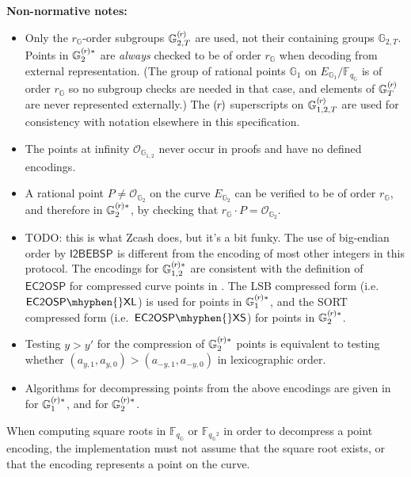 \documentclass{article}
\newcommand{\callout}[1]{\vspace{2ex plus 2pt minus 2pt}\noindent\textbf{#1}\hspace{1em}}
\newenvironment{nnotes}{\callout{Non-normative notes:}\begin{itemize}}{\end{itemize}}
\newcommand{\Field}[1]{\mathbb{F}_{\!#1}}
\newcommand{\mult}{\cdot}
\newcommand{\Curve}{E}
\newcommand{\Zero}{\mathcal{O}}
\newcommand{\subgroupr}{(\kern-0.075emr\kern-0.075em)}
\newcommand{\ParamG}[1]{{{#1}_\mathbb{G}}}
\newcommand{\ParamGexp}[2]{{{#1}_\mathbb{G}\!}^{#2}}
\newcommand{\GroupG}[1]{\mathbb{G}_{#1}}
\newcommand{\SubgroupG}[1]{\GroupG{#1}^{\subgroupr}}
\newcommand{\SubgroupGstar}[1]{\GroupG{#1}^{\subgroupr\ast}}
\newcommand{\CurveG}[1]{\Curve_{\GroupG{#1}}}
\newcommand{\ZeroG}[1]{\Zero_{\GroupG{#1}}}
\newcommand{\ECtoOSP}{\mathsf{EC2OSP}}
\newcommand{\ECtoOSPXL}{\mathsf{EC2OSP\mhyphen{}XL}}
\newcommand{\ECtoOSPXS}{\mathsf{EC2OSP\mhyphen{}XS}}
\newcommand{\ItoBEBSP}[1]{\mathsf{I2BEBSP}_{#1}}
\begin{document}
\begin{nnotes}
  \item Only the $\ParamG{r}$-order subgroups $\SubgroupG{2, T}$ are used,
        not their containing groups $\GroupG{2, T}$. Points in
        $\SubgroupGstar{2}$ are \emph{always} checked to be of order $\ParamG{r}$ when
        decoding from external representation. (The group of rational points $\GroupG{1}$
        on $\CurveG{1}/\Field{\ParamG{q}}$ is of order $\ParamG{r}$ so no subgroup checks are
        needed in that case, and elements of $\SubgroupG{T}$ are never represented externally.)
        The $\subgroupr$ superscripts on $\SubgroupG{1, 2, T}$ are used for consistency with
        notation elsewhere in this specification.
  \item The points at infinity $\ZeroG{1, 2}$ never occur in proofs and have no defined encodings.
  \item A rational point $P \neq \ZeroG{2}$ on the curve $\CurveG{2}$ can be
        verified to be of order $\ParamG{r}$, and therefore in $\SubgroupGstar{2}$,
        by checking that $\ParamG{r} \mult P = \ZeroG{2}$.
  \item TODO: this is what Zcash does, but it's a bit funky.
        The use of big-endian order by $\ItoBEBSP{}$ is different from the encoding
        of most other integers in this protocol.
        The encodings for $\SubgroupGstar{1, 2}$ are consistent with the
        definition of $\ECtoOSP{}$ for compressed curve points in
        \cite[section 5.5.6.2]{IEEE2004}. The LSB compressed form
        (i.e.\ $\ECtoOSPXL$) is used for points in $\SubgroupGstar{1}$,
        and the SORT compressed form (i.e.\ $\ECtoOSPXS$) for points in
        $\SubgroupGstar{2}$.
  \item Testing $y > y'$ for the compression of $\SubgroupGstar{2}$ points is equivalent
        to testing whether $(a_{y,1}, a_{y,0}) > (a_{-y,1}, a_{-y,0})$ in lexicographic order.
  \item Algorithms for decompressing points from the above encodings are
        given in \cite[Appendix A.12.8]{IEEE2000} for $\SubgroupGstar{1}$, and
        \cite[Appendix A.12.11]{IEEE2004} for $\SubgroupGstar{2}$.
\end{nnotes}

When computing square roots in $\Field{\ParamG{q}}$ or $\Field{\ParamGexp{q}{2}}$ in
order to decompress a point encoding, the implementation must not assume that
the square root exists, or that the encoding represents a point on the curve.
\end{document}
